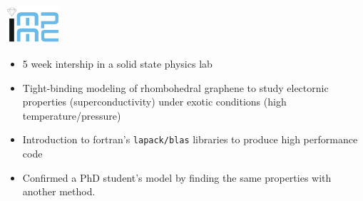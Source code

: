\noindent
\begin{minipage}{.15\textwidth}
    \centerline{\includegraphics[width=20mm]{img/impmc}}
\end{minipage}%
\hspace{5mm}
\begin{minipage}{.8\textwidth}
    \raggedright
    \begin{itemize}
	\item 5 week intership in a solid state physics lab
	\item Tight-binding modeling of rhombohedral graphene to study electornic properties (superconductivity) under exotic conditions (high temperature/pressure)
	\item Introduction to fortran's \texttt{lapack/blas} libraries to produce high performance code
	\item Confirmed a PhD student's model by finding the same properties with another method.
    \end{itemize}
\end{minipage}
